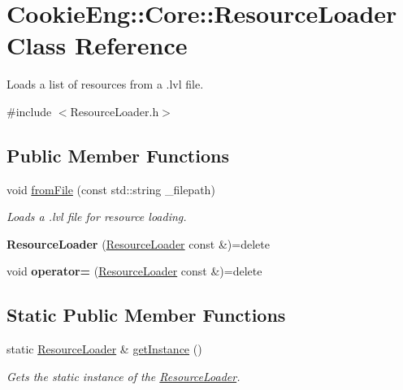 \hypertarget{class_cookie_eng_1_1_core_1_1_resource_loader}{}\section{Cookie\+Eng\+:\+:Core\+:\+:Resource\+Loader Class Reference}
\label{class_cookie_eng_1_1_core_1_1_resource_loader}


Loads a list of resources from a .lvl file.  




{\ttfamily \#include $<$Resource\+Loader.\+h$>$}

\subsection*{Public Member Functions}
\begin{DoxyCompactItemize}
\item 
void \hyperlink{class_cookie_eng_1_1_core_1_1_resource_loader_aaa1dfd99e22dd76e5c53783afc9a0b0f}{from\+File} (const std\+::string \+\_\+filepath)
\begin{DoxyCompactList}\small\item\em Loads a .lvl file for resource loading. \end{DoxyCompactList}\item 
\mbox{\label{class_cookie_eng_1_1_core_1_1_resource_loader_a60341b1bdc7a5a49905cbdca4697ca38}} 
{\bfseries Resource\+Loader} (\hyperlink{class_cookie_eng_1_1_core_1_1_resource_loader}{Resource\+Loader} const \&)=delete
\item 
\mbox{\label{class_cookie_eng_1_1_core_1_1_resource_loader_a7e23879937a6f5f750651d4cf227a436}} 
void {\bfseries operator=} (\hyperlink{class_cookie_eng_1_1_core_1_1_resource_loader}{Resource\+Loader} const \&)=delete
\end{DoxyCompactItemize}
\subsection*{Static Public Member Functions}
\begin{DoxyCompactItemize}
\item 
static \hyperlink{class_cookie_eng_1_1_core_1_1_resource_loader}{Resource\+Loader} \& \hyperlink{class_cookie_eng_1_1_core_1_1_resource_loader_a6830c862ac1d34c4a4f9c9e4299003a8}{get\+Instance} ()
\begin{DoxyCompactList}\small\item\em Gets the static instance of the \hyperlink{class_cookie_eng_1_1_core_1_1_resource_loader}{Resource\+Loader}. \end{DoxyCompactList}\end{DoxyCompactItemize}
